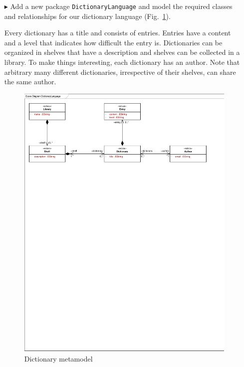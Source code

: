 \begin{enumerate}

\item[$\blacktriangleright$] Add a new package \texttt{DictionaryLanguage} and model the required classes and relationships for our dictionary language (Fig.~\ref{fig:moca-5-DictionaryMM}).

Every dictionary has a title and consists of entries.
Entries have a content and a level that indicates how difficult the entry is.
Dictionaries can be organized in shelves that have a description and shelves can be collected in a library.
To make things interesting, each dictionary has an author.
Note that arbitrary many different dictionaries, irrespective of their shelves, can share the same author.

\begin{figure}[!htbp]
\begin{center}
 \includegraphics[width=\textwidth]{pics/moca/1DictionaryMetaModel/DictionaryLanguage}
  \caption{Dictionary metamodel}
  \label{fig:moca-5-DictionaryMM}
\end{center}
\end{figure}


\end{enumerate}
